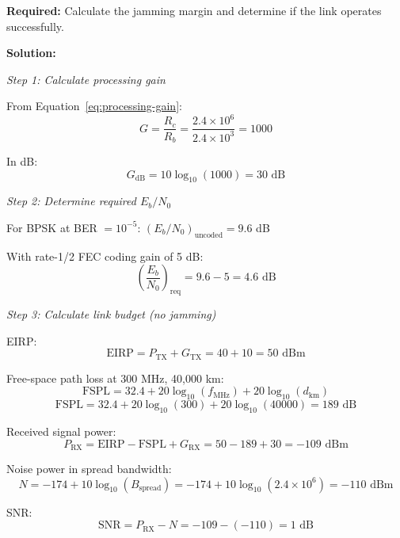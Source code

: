 \textbf{Required:} Calculate the jamming margin and determine if the link operates successfully.

\textbf{Solution:}

\textit{Step 1: Calculate processing gain}

From Equation~\ref{eq:processing-gain}:
\begin{equation}
G = \frac{R_c}{R_b} = \frac{2.4 \times 10^6}{2.4 \times 10^3} = 1000
\end{equation}

In dB:
\begin{equation}
G_{\text{dB}} = 10\log_{10}(1000) = 30 \text{ dB}
\end{equation}

\textit{Step 2: Determine required $E_b/N_0$}

For BPSK at BER $= 10^{-5}$: $(E_b/N_0)_{\text{uncoded}} = 9.6$ dB

With rate-1/2 FEC coding gain of 5 dB:
\begin{equation}
\left(\frac{E_b}{N_0}\right)_{\text{req}} = 9.6 - 5 = 4.6 \text{ dB}
\end{equation}

\textit{Step 3: Calculate link budget (no jamming)}

EIRP:
\begin{equation}
\text{EIRP} = P_{\text{TX}} + G_{\text{TX}} = 40 + 10 = 50 \text{ dBm}
\end{equation}

Free-space path loss at 300 MHz, 40,000 km:
\begin{equation}
\text{FSPL} = 32.4 + 20\log_{10}(f_{\text{MHz}}) + 20\log_{10}(d_{\text{km}})
\end{equation}
\begin{equation}
\text{FSPL} = 32.4 + 20\log_{10}(300) + 20\log_{10}(40000) = 189 \text{ dB}
\end{equation}

Received signal power:
\begin{equation}
P_{\text{RX}} = \text{EIRP} - \text{FSPL} + G_{\text{RX}} = 50 - 189 + 30 = -109 \text{ dBm}
\end{equation}

Noise power in spread bandwidth:
\begin{equation}
N = -174 + 10\log_{10}(B_{\text{spread}}) = -174 + 10\log_{10}(2.4 \times 10^6) = -110 \text{ dBm}
\end{equation}

SNR:
\begin{equation}
\text{SNR} = P_{\text{RX}} - N = -109 - (-110) = 1 \text{ dB}
\end{equation}

